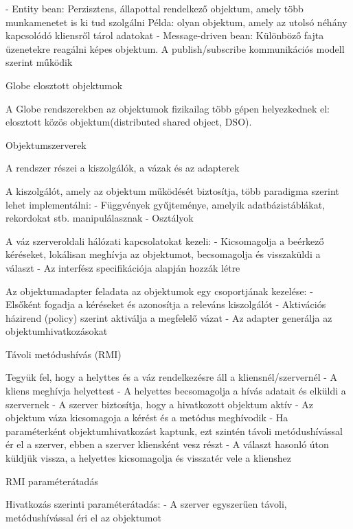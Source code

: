 \documentclass[12pt]{article}
\begin{document}
\begin{description}[style=unboxed]
        - Entity bean: Perzisztens, állapottal rendelkező objektum, amely több munkamenetet is ki tud szolgálni
        Példa: olyan objektum, amely az utolsó néhány kapcsolódó kliensről tárol adatokat
        - Message-driven bean: Különböző fajta üzenetekre reagálni képes objektum. A publish/subscribe kommunikációs
        modell szerint működik
    \item  Globe elosztott objektumok
    \item A Globe rendszerekben az objektumok fizikailag több gépen helyezkednek el: elosztott közös objektum(distributed shared object, DSO).
    \item  Objektumszerverek
    \item A rendszer részei a kiszolgálók, a vázak és az adapterek
    \item A kiszolgálót, amely az objektum működését biztosítja, több paradigma szerint lehet implementálni:
        - Függvények gyűjteménye, amelyik adatbázistáblákat, rekordokat stb.
        manipulálasznak
        - Osztályok
    \item A váz szerveroldali hálózati kapcsolatokat kezeli:
        - Kicsomagolja a beérkező kéréseket, lokálisan meghívja az objektumot, becsomagolja és visszaküldi a választ
        - Az interfész specifikációja alapján hozzák létre
    \item Az objektumadapter feladata az objektumok egy csoportjának kezelése:
        - Elsőként fogadja a kéréseket és azonosítja a releváns kiszolgálót
        - Aktivációs házirend (policy) szerint aktiválja  a megfelelő vázat
        - Az adapter generálja az objektumhivatkozásokat 
    \item  Távoli metódushívás (RMI)
    \item Tegyük fel, hogy a helyttes és a váz rendelkezésre áll a kliensnél/szervernél
        - A kliens meghívja helyettest
        - A helyettes becsomagolja a hívás adatait és elküldi a szervernek
        - A szerver biztosítja, hogy a hivatkozott objektum aktív
        - Az objektum váza kicsomagoja a kérést és a metódus meghívodik
        - Ha paraméterként objektumhivatkozást kaptunk, ezt szintén távoli metódushívással ér el a szerver,
        ebben a szerver kliensként vesz részt
        - A választ hasonló úton küldjük vissza, a helyettes kicsomagolja és visszatér vele a klienshez
    \item  RMI paraméterátadás
    \item Hivatkozás szerinti paraméterátadás:
        - A szerver egyszerűen távoli, metódushívással éri el az objektumot

\end{description}
\end{document}
